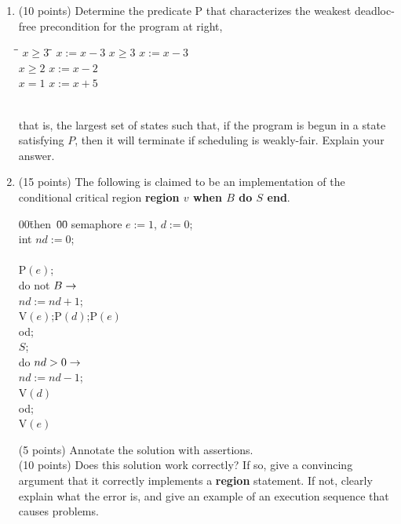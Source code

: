 \begin{enumerate}
\begin{enumerate}
\item 
\begin{minipage}[t]{2in}
(10 points)
Determine the predicate P that characterizes the weakest deadloc-free
precondition for the program at right,
\end{minipage}\quad
\begin{minipage}[t]{2in}
\begin{tabbing}
\co\= \lb {}\= $x \geq 3$ \=\= $x := x - 3$ \rb\kill
\co\> \lb \await \> $x \geq 3$ \>\ra \>$x := x - 3$ \rb\\
\pa\> \lb \await \> $x \geq 2$ \>\ra \>$x := x - 2$ \rb\\
\pa\> \lb \await \> $x = 1$ \>\ra \>$x := x + 5$ \rb\\
\oc
\end{tabbing}
\end{minipage}\\
\noindent that is, the largest set of states such
that, if the program is begun in a state satisfying $P$, then it will
terminate if scheduling is weakly-fair. Explain your
answer.

\item (15 points)
The following is claimed to be an implementation of
the conditional critical region {\bf region $v$ when $B$ do $S$ end}.

\begin{minipage}{2in}
{\bf
\begin{tabbing}
00\=then~\=00\=\kill
semaphore $e := 1$, $d := 0$;\\
int $nd := 0$;\\
\\
P$(e)$;\\
do not $B \rightarrow$\+\\
  $nd := nd + 1$;\\
  V$(e)$;\quad  P$(d)$;\quad   P$(e)$\-\\
od;\\
$S$;\\
do $nd > 0 \rightarrow$\+\\
  $nd := nd - 1$;\\
  V$(d)$\-\\
od;\\
V$(e)$
\end{tabbing}
}
\end{minipage}\quad
\begin{minipage}{2in}
(5 points) Annotate the solution with assertions.\\

(10 points) Does this solution work correctly?  If so, give a
convincing argument that it correctly implements a {\bf region}
statement.  If not, clearly explain what the error is, and give an
example of an execution sequence that causes problems.
\end{minipage}
\end{enumerate}


\end{enumerate}
